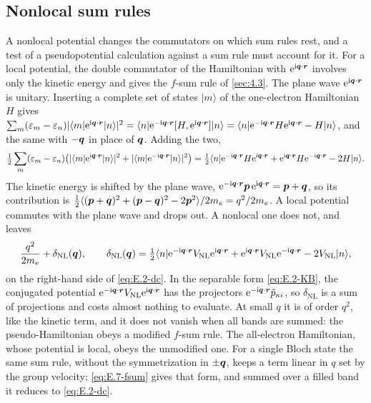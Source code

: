 \subsection{Nonlocal sum rules}

A nonlocal potential changes the commutators on which sum rules rest, and a test of a pseudopotential calculation against a sum rule must account for it. For a local potential, the double commutator of the Hamiltonian with $\mathrm{e}^{\mathrm{i}\bm{q}\cdot\bm{r}}$ involves only the kinetic energy and gives the $f$-sum rule of \cref{sec:4.3}. The plane wave $\mathrm{e}^{\mathrm{i}\bm{q}\cdot\bm{r}}$ is unitary. Inserting a complete set of states $|m\rangle$ of the one-electron Hamiltonian $H$ gives $\sum_m(\varepsilon_m - \varepsilon_n)|\langle m|\mathrm{e}^{\mathrm{i}\bm{q}\cdot\bm{r}}|n\rangle|^2 = \langle n|\mathrm{e}^{-\mathrm{i}\bm{q}\cdot\bm{r}}[H, \mathrm{e}^{\mathrm{i}\bm{q}\cdot\bm{r}}]|n\rangle = \langle n|\mathrm{e}^{-\mathrm{i}\bm{q}\cdot\bm{r}}H\mathrm{e}^{\mathrm{i}\bm{q}\cdot\bm{r}} - H|n\rangle$, and the same with $-\bm{q}$ in place of $\bm{q}$. Adding the two,
\begin{equation}
  \tfrac12\sum_m(\varepsilon_m - \varepsilon_n)\bigl(|\langle m|\mathrm{e}^{\mathrm{i}\bm{q}\cdot\bm{r}}|n\rangle|^2 + |\langle m|\mathrm{e}^{-\mathrm{i}\bm{q}\cdot\bm{r}}|n\rangle|^2\bigr) = \tfrac12\langle n|\mathrm{e}^{-\mathrm{i}\bm{q}\cdot\bm{r}}H\mathrm{e}^{\mathrm{i}\bm{q}\cdot\bm{r}} + \mathrm{e}^{\mathrm{i}\bm{q}\cdot\bm{r}}H\mathrm{e}^{-\mathrm{i}\bm{q}\cdot\bm{r}} - 2H|n\rangle .
  \label{eq:E.2-dc}
\end{equation}
The kinetic energy is shifted by the plane wave, $\mathrm{e}^{-\mathrm{i}\bm{q}\cdot\bm{r}}\bm{p}\,\mathrm{e}^{\mathrm{i}\bm{q}\cdot\bm{r}} = \bm{p} + \bm{q}$, so its contribution is $\tfrac12\langle(\bm{p} + \bm{q})^2 + (\bm{p} - \bm{q})^2 - 2\bm{p}^2\rangle/2m_e = q^2/2m_e$. A local potential commutes with the plane wave and drops out. A nonlocal one does not, and leaves
\begin{equation}
  \frac{q^2}{2m_e} + \delta_{\mathrm{NL}}(\bm{q}), \qquad
  \delta_{\mathrm{NL}}(\bm{q}) = \tfrac12\langle n|\mathrm{e}^{-\mathrm{i}\bm{q}\cdot\bm{r}}V_{\mathrm{NL}}\mathrm{e}^{\mathrm{i}\bm{q}\cdot\bm{r}} + \mathrm{e}^{\mathrm{i}\bm{q}\cdot\bm{r}}V_{\mathrm{NL}}\mathrm{e}^{-\mathrm{i}\bm{q}\cdot\bm{r}} - 2V_{\mathrm{NL}}|n\rangle ,
  \label{eq:E.2-fsumNL}
\end{equation}
on the right-hand side of \cref{eq:E.2-dc}. In the separable form \cref{eq:E.2-KB}, the conjugated potential $\mathrm{e}^{-\mathrm{i}\bm{q}\cdot\bm{r}}V_{\mathrm{NL}}\mathrm{e}^{\mathrm{i}\bm{q}\cdot\bm{r}}$ has the projectors $\mathrm{e}^{-\mathrm{i}\bm{q}\cdot\bm{r}}\tilde p_{\kappa i}$, so $\delta_{\mathrm{NL}}$ is a sum of projections and costs almost nothing to evaluate. At small $q$ it is of order $q^2$, like the kinetic term, and it does not vanish when all bands are summed: the pseudo-Hamiltonian obeys a modified $f$-sum rule. The all-electron Hamiltonian, whose potential is local, obeys the unmodified one. For a single Bloch state the same sum rule, without the symmetrization in $\pm\bm{q}$, keeps a term linear in $q$ set by the group velocity; \cref{eq:E.7-fsum} gives that form, and summed over a filled band it reduces to \cref{eq:E.2-dc}.

